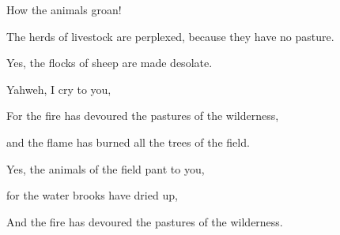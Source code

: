 {\par }{\Q {}How the animals groan!
\par }{\QB The herds of livestock are perplexed, because they have no pasture.
\par }{\QB Yes, the flocks of sheep are made desolate.
\par }{\Q {}Yahweh, I cry to you,
\par }{\QB For the fire has devoured the pastures of the wilderness,
\par }{\QB and the flame has burned all the trees of the field.
\par }{\Q {}Yes, the animals of the field pant to you,
\par }{\QB for the water brooks have dried up,
\par }{\QB And the fire has devoured the pastures of the wilderness.
\par }{\BB \par }

